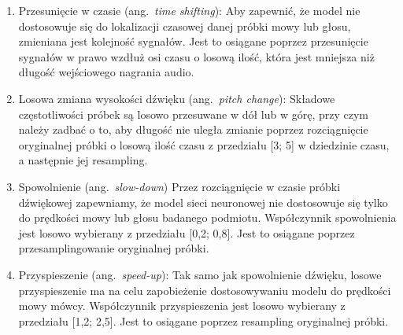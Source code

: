 \begin{enumerate}[label={\alph*)}]
	\item Przesunięcie w czasie (ang.~\emph{time shifting}): Aby zapewnić, że model nie dostosowuje się do lokalizacji czasowej danej próbki mowy lub głosu, zmieniana jest kolejność sygnałów. Jest to osiągane poprzez przesunięcie sygnałów w prawo wzdłuż osi czasu o losową ilość, która jest mniejsza niż długość wejściowego nagrania audio.
    \item Losowa zmiana wysokości dźwięku (ang.~\emph{pitch change}): Składowe częstotliwości próbek są losowo przesuwane w dół lub w górę, przy czym należy zadbać o to, aby długość nie uległa zmianie poprzez rozciągnięcie oryginalnej próbki o losową ilość czasu z przedziału [3; 5] w dziedzinie czasu, a następnie jej resampling.
    \item Spowolnienie (ang.~\emph{slow-down})
Przez rozciągnięcie w czasie próbki dźwiękowej zapewniamy, że model sieci neuronowej nie dostosowuje się tylko do prędkości mowy lub głosu badanego podmiotu. Współczynnik spowolnienia jest losowo wybierany z przedziału [0,2; 0,8]. Jest to osiągane poprzez przesamplingowanie oryginalnej próbki.
    \item Przyspieszenie (ang.~\emph{speed-up}): Tak samo jak spowolnienie dźwięku, losowe przyspieszenie ma na celu zapobieżenie dostosowywaniu modelu do prędkości mowy mówcy. Współczynnik przyspieszenia jest losowo wybierany z przedziału [1,2; 2,5]. Jest to osiągane poprzez resampling oryginalnej próbki.
\end{enumerate}


